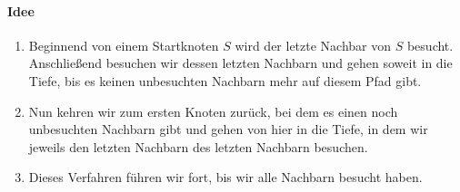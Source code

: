 \documentclass[11pt,a4paper]{scrartcl}
\begin{document}
\paragraph{Idee}
\begin{enumerate}
\item Beginnend von einem Startknoten $S$ wird der letzte Nachbar von $S$ besucht. Anschließend besuchen wir dessen letzten Nachbarn und gehen soweit in die Tiefe, bis es keinen unbesuchten Nachbarn mehr auf diesem Pfad gibt.
\item Nun kehren wir zum ersten Knoten zurück, bei dem es einen noch unbesuchten Nachbarn gibt und gehen von hier in die Tiefe, in dem wir jeweils den letzten Nachbarn des letzten Nachbarn besuchen.
\item Dieses Verfahren führen wir fort, bis wir alle Nachbarn besucht haben.
\end{enumerate}
\end{document}
